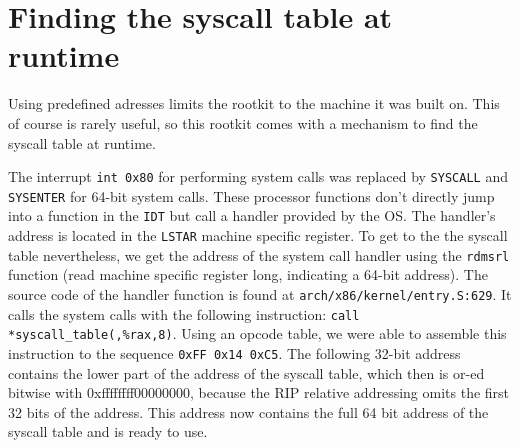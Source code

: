 \section{Finding the syscall table at runtime}
Using predefined adresses limits the rootkit to the machine it was 
built on. This of course is rarely useful, so this rootkit comes with a 
mechanism to find the syscall table at runtime. \par
The interrupt \texttt{int 0x80} for performing system calls was replaced by 
\texttt{SYSCALL} and \texttt{SYSENTER} for 64-bit system calls. These processor 
functions don't directly jump into a function in the \texttt{IDT} but call a 
handler provided by the OS. The handler's address is located in the 
\texttt{LSTAR} machine specific register. To get to the the syscall table 
nevertheless, we get the address of the system call handler using the 
\texttt{rdmsrl} function (read 
machine specific register long, indicating a 64-bit address). The source code 
of the handler function is found at \texttt{arch/x86/kernel/entry.S:629}. It 
calls the system calls with the following instruction: 
\verb+call *syscall_table(,%rax,8)+. Using an opcode table, we were able to 
assemble this instruction to the sequence \texttt{0xFF 0x14 0xC5}. The following 
32-bit address contains the lower part of the address of the syscall table,
which then is or-ed bitwise with 0xffffffff00000000, because the RIP 
relative addressing omits the first 32 bits of the address. This address now 
contains the full 64 bit address of the syscall table and is ready to use.